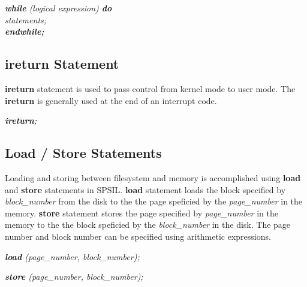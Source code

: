 \documentclass[11pt]{article}
\begin{document}
\textit{
\textbf{while} (logical expression) \textbf{do}  \\
 \indent \indent statements; \\
\indent \textbf{endwhile;}  \\
}


\subsection{ireturn Statement}
\textbf{ireturn} statement is used to pass control from kernel mode to user mode. The \textbf{ireturn} is generally used at the end of an interrupt code.

\textit{\textbf{ireturn};}


\subsection{Load / Store Statements}
Loading and storing between filesystem and memory is accomplished using \textbf{load} and \textbf{store} statements in SPSIL. \textbf{load} statement loads the block specified by \textit{block\_number} from the disk to the the page speficied by the \textit{page\_number} in the memory. \textbf{store} statement stores the page specified by \textit{page\_number} in the memory to the the block speficied by the \textit{block\_number} in the disk. The page number and block number can be specified using arithmetic expressions.

\textit{\textbf{load} (page\_number, block\_number);}

\textit{\textbf{store} (page\_number, block\_number);}
\end{document}
